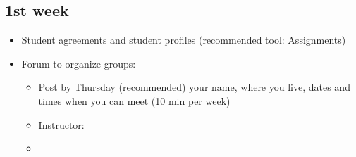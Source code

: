 \documentclass[]{article}
\providecommand{\tightlist}{%
  \setlength{\itemsep}{0pt}\setlength{\parskip}{0pt}}
\begin{document}
\subsection{1st week}\label{st-week}

\begin{itemize}
\tightlist
\item
  Student agreements and student profiles (recommended tool:
  Assignments)
\item
  Forum to organize groups:

  \begin{itemize}
  \item
    Post by Thursday (recommended) your name, where you live, dates and
    times when you can meet (10 min per week)
  \item
    Instructor:
  \item
  \end{itemize}
\end{itemize}
\end{document}
